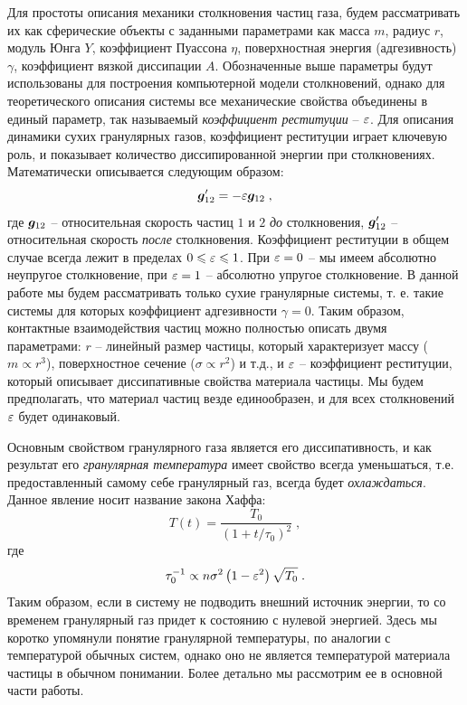 Для простоты описания механики столкновения частиц газа, будем рассматривать их как сферические объекты с заданными параметрами как
масса $m$, радиус $r$, модуль Юнга $Y$, коэффициент Пуассона $\eta$, поверхностная энергия (адгезивность) $\gamma$, коэффициент вязкой диссипации $A$.
Обозначенные выше параметры будут использованы для построения компьютерной модели столкновений, однако для теоретического описания системы
все механические свойства объединены в единый параметр, так называемый \emph{коэффициент реституции} -- $\varepsilon$. Для описания динамики сухих
гранулярных газов, коэффициент реституции играет ключевую роль, и показывает количество диссипированной энергии при столкновениях. Математически
описывается следующим образом:
\begin{equation}\label{eq:restitution}
    \bm{g}'_{12} = -\varepsilon\bm{g}_{12}\;,
\end{equation}
где $\bm{g}_{12}$ -- относительная скорость частиц $1$ и $2$ \emph{до} столкновения, $\bm{g}'_{12}$ -- относительная скорость \emph{после} столкновения.
Коэффициент реституции в общем случае всегда лежит в пределах $0\leqslant\varepsilon\leqslant 1$. При $\varepsilon = 0$ -- мы имеем абсолютно неупругое столкновение, 
при $\varepsilon = 1$ -- абсолютно упругое столкновение. В данной работе мы будем рассматривать только сухие гранулярные системы, т. е. такие
системы для которых коэффициент адгезивности $\gamma = 0$. Таким образом, контактные взаимодействия частиц можно полностью описать двумя параметрами:
$r$ -- линейный размер частицы, который характеризует массу ($m\propto r^3$), поверхностное сечение ($\sigma\propto r^2$) и т.д., 
и $\varepsilon$ -- коэффициент реституции, который описывает диссипативные свойства материала частицы. Мы будем предполагать, что материал частиц 
везде единообразен, и для всех столкновений $\varepsilon$ будет одинаковый. 

Основным свойством гранулярного газа является его диссипативность, и как результат его \emph{гранулярная температура} имеет свойство всегда уменьшаться, 
т.е. предоставленный самому себе гранулярный газ, всегда будет \emph{охлаждаться}. Данное явление носит название закона Хаффа:
\begin{equation}
    T(t) = \frac{T_0}{(1+t/\tau_0)^2}\;, 
\end{equation}
где
\begin{equation}
    \tau^{-1}_0\propto n\sigma^2\left(1-\varepsilon^2\right)\sqrt{T_0}\;.
\end{equation}
Таким образом, если в систему не подводить внешний источник энергии, то со временем гранулярный газ придет к состоянию с нулевой энергией. Здесь мы
коротко упомянули понятие гранулярной температуры, по аналогии с температурой обычных систем, однако оно не является температурой материала частицы 
в обычном понимании. Более детально мы рассмотрим ее в основной части работы.

